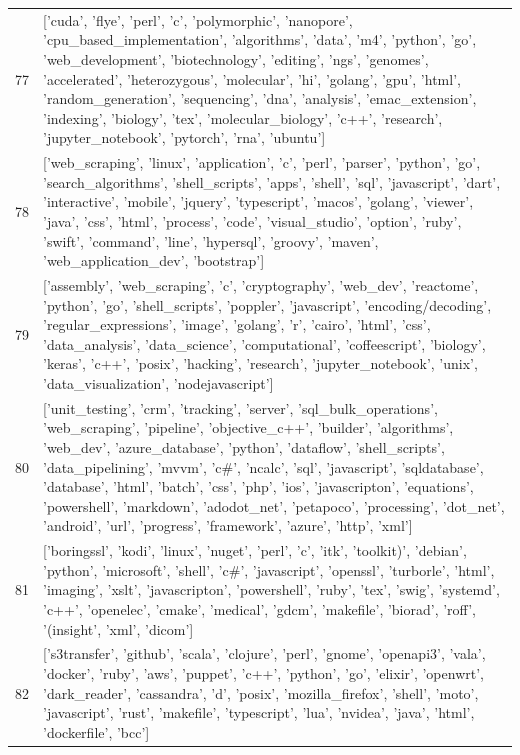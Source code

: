 \begin{center}
\begin{longtable}{|p{1.5cm}|p{12.5cm}|}
            77 & ['cuda', 'flye', 'perl', 'c', 'polymorphic', 'nanopore', 'cpu\_based\_implementation', 'algorithms', 'data', 'm4', 'python', 'go', 'web\_development', 'biotechnology', 'editing', 'ngs', 'genomes', 'accelerated', 'heterozygous', 'molecular', 'hi', 'golang', 'gpu', 'html', 'random\_generation', 'sequencing', 'dna', 'analysis', 'emac\_extension', 'indexing', 'biology', 'tex', 'molecular\_biology', 'c++', 'research', 'jupyter\_notebook', 'pytorch', 'rna', 'ubuntu']  \\ 
            78 & ['web\_scraping', 'linux', 'application', 'c', 'perl', 'parser', 'python', 'go', 'search\_algorithms', 'shell\_scripts', 'apps', 'shell', 'sql', 'javascript', 'dart', 'interactive', 'mobile', 'jquery', 'typescript', 'macos', 'golang', 'viewer', 'java', 'css', 'html', 'process', 'code', 'visual\_studio', 'option', 'ruby', 'swift', 'command', 'line', 'hypersql', 'groovy', 'maven', 'web\_application\_dev', 'bootstrap']  \\ 
            79 & ['assembly', 'web\_scraping', 'c', 'cryptography', 'web\_dev', 'reactome', 'python', 'go', 'shell\_scripts', 'poppler', 'javascript', 'encoding/decoding', 'regular\_expressions', 'image', 'golang', 'r', 'cairo', 'html', 'css', 'data\_analysis', 'data\_science', 'computational', 'coffeescript', 'biology', 'keras', 'c++', 'posix', 'hacking', 'research', 'jupyter\_notebook', 'unix', 'data\_visualization', 'nodejavascript']  \\ 
            80 & ['unit\_testing', 'crm', 'tracking', 'server', 'sql\_bulk\_operations', 'web\_scraping', 'pipeline', 'objective\_c++', 'builder', 'algorithms', 'web\_dev', 'azure\_database', 'python', 'dataflow', 'shell\_scripts', 'data\_pipelining', 'mvvm', 'c\#', 'ncalc', 'sql', 'javascript', 'sqldatabase', 'database', 'html', 'batch', 'css', 'php', 'ios', 'javascripton', 'equations', 'powershell', 'markdown', 'adodot\_net', 'petapoco', 'processing', 'dot\_net', 'android', 'url', 'progress', 'framework', 'azure', 'http', 'xml']  \\ 
            81 & ['boringssl', 'kodi', 'linux', 'nuget', 'perl', 'c', 'itk', 'toolkit)', 'debian', 'python', 'microsoft', 'shell', 'c\#', 'javascript', 'openssl', 'turborle', 'html', 'imaging', 'xslt', 'javascripton', 'powershell', 'ruby', 'tex', 'swig', 'systemd', 'c++', 'openelec', 'cmake', 'medical', 'gdcm', 'makefile', 'biorad', 'roff', '(insight', 'xml', 'dicom']  \\ 
            82 & ['s3transfer', 'github', 'scala', 'clojure', 'perl', 'gnome', 'openapi3', 'vala', 'docker', 'ruby', 'aws', 'puppet', 'c++', 'python', 'go', 'elixir', 'openwrt', 'dark\_reader', 'cassandra', 'd', 'posix', 'mozilla\_firefox', 'shell', 'moto', 'javascript', 'rust', 'makefile', 'typescript', 'lua', 'nvidea', 'java', 'html', 'dockerfile', 'bcc']  \\ 

\end{longtable}
\end{center}
